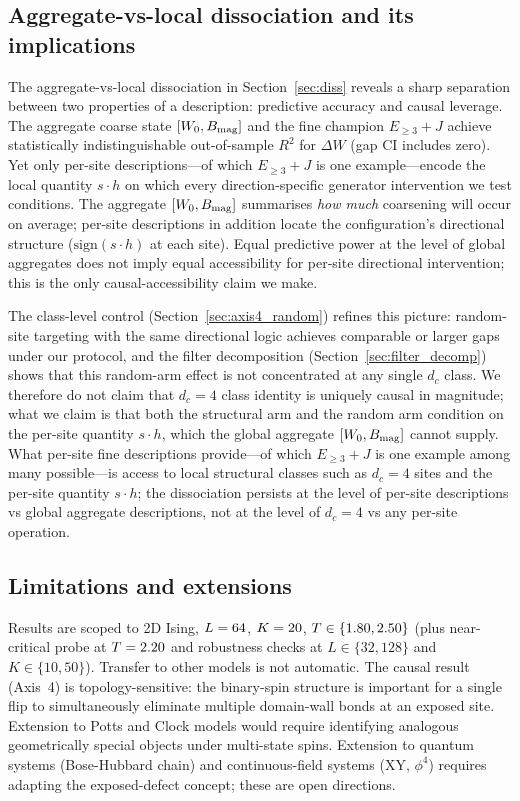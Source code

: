\documentclass[aps,pre,preprint,superscriptaddress,showpacs]{revtex4-2}
\begin{document}
\subsection{Aggregate-vs-local dissociation and its implications}

The aggregate-vs-local dissociation in Section~\ref{sec:diss} reveals a
sharp separation between two properties of a description: predictive
accuracy and causal leverage.
The aggregate coarse state $[W_0, B_{\rm mag}]$ and the fine champion
$E_{\geq 3}+J$ achieve statistically indistinguishable out-of-sample
$R^2$ for $\Delta W$ (gap CI includes zero).
Yet only per-site descriptions---of which $E_{\geq 3}+J$ is one
example---encode the local quantity $s\cdot h$ on which every
direction-specific generator intervention we test conditions.
The aggregate $[W_0, B_{\rm mag}]$ summarises \emph{how much}
coarsening will occur on average; per-site descriptions in addition
locate the configuration's directional structure
($\mathrm{sign}(s\cdot h)$ at each site).
Equal predictive power at the level of global aggregates does not
imply equal accessibility for per-site directional intervention; this
is the only causal-accessibility claim we make.

The class-level control (Section~\ref{sec:axis4_random}) refines this
picture: random-site targeting with the same directional logic
achieves comparable or larger gaps under our protocol, and the filter
decomposition (Section~\ref{sec:filter_decomp}) shows that this random-arm
effect is not concentrated at any single $d_c$ class.
We therefore do not claim that $d_c=4$ class identity is uniquely causal
in magnitude; what we claim is that both the structural arm and the
random arm condition on the per-site quantity $s\cdot h$, which the
global aggregate $[W_0, B_{\rm mag}]$ cannot supply.
What per-site fine descriptions provide---of which $E_{\geq 3}+J$ is
one example among many possible---is access to local structural
classes such as $d_c=4$ sites and the per-site quantity $s\cdot h$;
the dissociation persists at the level of per-site descriptions vs
global aggregate descriptions, not at the level of $d_c=4$ vs any
per-site operation.

\subsection{Limitations and extensions}

Results are scoped to 2D Ising, $L=64$, $K=20$, $T\in\{1.80, 2.50\}$
(plus near-critical probe at $T=2.20$ and robustness checks at
$L\in\{32,128\}$ and $K\in\{10,50\}$).
Transfer to other models is not automatic.
The causal result (Axis~4) is topology-sensitive: the binary-spin structure
is important for a single flip to simultaneously eliminate multiple
domain-wall bonds at an exposed site.
Extension to Potts and Clock models would require identifying analogous
geometrically special objects under multi-state spins.
Extension to quantum systems (Bose-Hubbard chain) and continuous-field
systems (XY, $\phi^4$) requires adapting the exposed-defect concept; these
are open directions.
\end{document}
